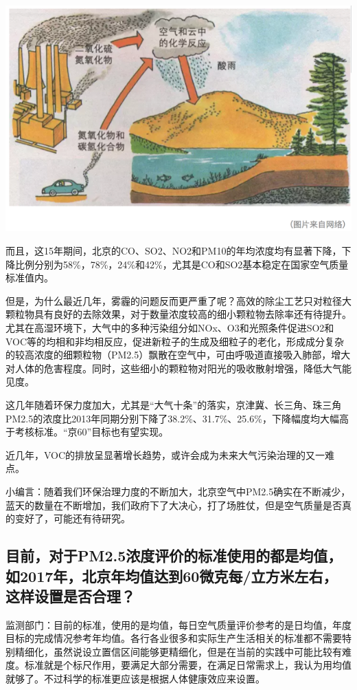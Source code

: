 \documentclass[]{book}
\begin{document}
\includegraphics[width=8.33in]{images/air2}

而且，这15年期间，北京的CO、SO2、NO2和PM10的年均浓度均有显著下降，下降比例分别为58\%，78\%，24\%和42\%，尤其是CO和SO2基本稳定在国家空气质量标准值内。

但是，为什么最近几年，雾霾的问题反而更严重了呢？高效的除尘工艺只对粒径大颗粒物具有良好的去除效果，对于数量浓度较高的细小颗粒物去除率还有待提升。尤其在高湿环境下，大气中的多种污染组分如NOx、O3和光照条件促进SO2和VOC等的均相和非均相反应，促进新粒子的生成及细粒子的老化，形成成分复杂的较高浓度的细颗粒物（PM2.5）飘散在空气中，可由呼吸道直接吸入肺部，增大对人体的危害程度。同时，这些细小的颗粒物对阳光的吸收散射增强，降低大气能见度。

这几年随着环保力度加大，尤其是``大气十条''的落实，京津冀、长三角、珠三角PM2.5的浓度比2013年同期分别下降了38.2\%、31.7\%、25.6\%，下降幅度均大幅高于考核标准。``京60''目标也有望实现。

近几年，VOC的排放呈显著增长趋势，或许会成为未来大气污染治理的又一难点。

小编言：随着我们环保治理力度的不断加大，北京空气中PM2.5确实在不断减少，蓝天的数量在不断增加，我们政府下了大决心，打了场胜仗，但是空气质量是否真的变好了，可能还有待研究。

\subsection{目前，对于PM2.5浓度评价的标准使用的都是均值，如2017年，北京年均值达到60微克每/立方米左右，这样设置是否合理？}\label{pm2.5201760}

监测部门：目前的标准，使用的是均值，每日空气质量评价参考的是日均值，年度目标的完成情况参考年均值。各行各业很多和实际生产生活相关的标准都不需要特别精细化，虽然说设立置信区间能够更精细化，但是在当前的实践中可能比较有难度。标准就是个标尺作用，要满足大部分需要，在满足日常需求上，我认为用均值就够了。不过科学的标准更应该是根据人体健康效应来设置。
\end{document}
